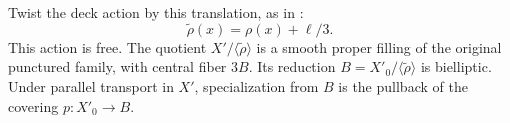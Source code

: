 \begin{proposition}\label{fill:log}
Twist the deck action by this translation, as in
\cite[Construction~3.5]{Engel}:
\[
 \widetilde\rho(x)=\rho(x)+\ell/3.
\]
This action is free. The quotient $X'/\langle\widetilde\rho\rangle$
is a smooth proper filling of the original punctured family, with
central fiber $3B$. Its reduction $B=X'_0/\langle\widetilde\rho\rangle$
is bielliptic. Under parallel transport in $X'$, specialization from
$B$ is the pullback of the covering $p:X'_0\to B$.
\end{proposition}
